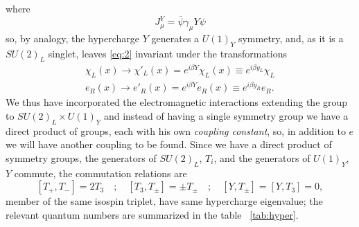 where
\begin{equation}
  \label{eq:8}
  J_{\mu}^{Y} = \bar{\psi} \gamma_{\mu} Y \psi
\end{equation}
so, by analogy, the hypercharge $Y$ generates a $U(1)_{Y}$ symmetry, and, as it
is a $SU(2)_{L}$ singlet, leaves \eqref{eq:2} invariant under the
transformations
\begin{equation}
  \label{eq:9}
  \begin{split}
    \chi_{L}(x) \rightarrow \chi'_{L}(x) = e^{i \beta Y} \chi_{L}(x)
    \equiv e^{i \beta y_{L}} \chi_{L} \\
    e_{R}(x) \rightarrow e'_{R}(x) = e^{i \beta Y}e_{R}(x) \equiv e^{i \beta
      y_{R}}e_{R}.
  \end{split}
\end{equation}
We thus have incorporated the electromagnetic interactions extending the group
to $SU(2)_{L} \times U(1)_{Y}$ and instead of having a single symmetry group we
have a direct product of groups, each with his own \emph{coupling constant}, so,
in addition to $e$ we will have another coupling to be found.  Since we have a
direct product of symmetry groups, the generators of $SU(2)_{L}$, $T_{i}$, and
the generators of $U(1)_{Y}$, $Y$ commute, the commutation relations are
\begin{equation}
  \label{eq:10}
  [T_{+},T_{-}] = 2 T_{3} \quad ; \quad [T_{3},T_{\pm}] = \pm T_{\pm}
  \quad ; \quad [Y,T_{\pm}] = [Y,T_{3}] = 0,
\end{equation}
member of the same isospin triplet, have same hypercharge eigenvalue; the
relevant quantum numbers are summarized in the table ~\ref{tab:hyper}.
